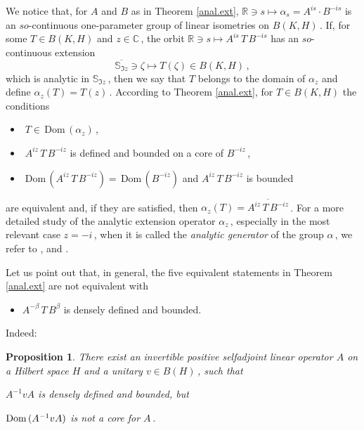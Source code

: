 \documentclass[reqno]{amsart}
\newtheorem{proposition}[theorem]{Proposition}
\theoremstyle{definition}
\theoremstyle{remark}
\numberwithin{equation}{section}
\theoremstyle{plain}
\begin{document}
We notice that, for $A$ and $B$ as in Theorem \ref{anal.ext},
$\mathbb R\ni s\longmapsto \alpha_s =A^{is}\cdot B^{-is}$ is an
$so$-continuous one-parameter group of linear isometries on
$B(K,H)\,$. If, for some $T\in B(K,H)$ and $z\in\mathbb C\,$, the
orbit $\mathbb R\ni s\longmapsto A^{is}\, T\, B^{-is}$ has an
$so$-continuous extension
\begin{equation*}
\overline{\mathbb S_{\Im z}}\ni\zeta\longmapsto T(\zeta )\in
B(K,H)\, ,
\end{equation*}
which is analytic in $\mathbb S_{\Im z}\,$, then we say that $T$
belongs to the domain of $\alpha_z$ and define $\alpha_z (T)=
T(z)\,$. According to Theorem \ref{anal.ext}, for $T\in B(K,H)$
the conditions
\begin{itemize}
\item[--] $\; T\in\,\text{Dom}\, (\alpha_z )\,$,
\item[--] $\; A^{i z}\, T\, B^{-i z}$ is defined and bounded on
a core of $B^{-i z}\,$,
\item[--] $\;\text{Dom}\, (A^{i z}\, T\, B^{-i z}) =\,\text{Dom}\,
(B^{-i z})$ and $A^{i z}\, T\, B^{-i z}$ is bounded
\end{itemize}
are equivalent and, if they are satisfied, then $\alpha_z (T)=
\overline{A^{i z}\, T\, B^{-i z}}\,$.
For a more detailed study of the analytic extension operator
$\alpha_z\,$, especially in the most relevant case $z=-i\,$,
when it is called the \emph{analytic generator} of the group
$\alpha\,$, we refer to \cite{C-Z}, \cite{Z1} and \cite{Z2}.
\smallskip

Let us point out that, in general, the five equivalent statements
in Theorem \ref{anal.ext} are not equivalent with
\begin{itemize}
\item[$(4')$] $A^{-\beta}\, T\, B^\beta$ is densely defined and
bounded.
\end{itemize}
Indeed:
\smallskip

\begin{proposition}\label{counterex.}
There exist an invertible positive selfadjoint linear operator $A$
on a Hilbert space $H$ and a unitary $v\in B(H)\,$, such that
\smallskip

\noindent\hspace{3 cm} $A^{-1} v A$ is densely defined
and bounded, but

\noindent\hspace{3 cm} $\text{\rm Dom}\, (A^{-1} v A)$ is
not a core for $A\,$.
\end{proposition}
\smallskip
\end{document}
